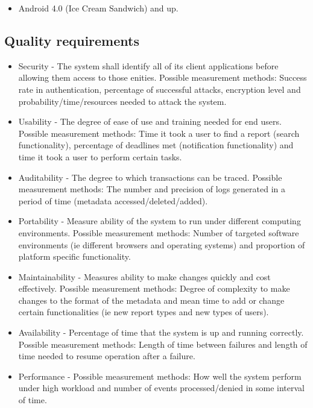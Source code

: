 \documentclass[11pt]{article}
\begin{document}
\begin{itemize}
	\item Android 4.0 (Ice Cream Sandwich) and up.
\end{itemize}

\subsection{Quality requirements}

\begin{itemize}
	\item Security - The system shall identify all of its client applications before allowing them access to those enities. Possible measurement methods: Success rate in authentication, percentage of successful attacks, encryption level and probability/time/resources needed to attack the system.
	\item Usability - The degree of ease of use and training needed for end users. Possible measurement methods: Time it took a user to find a report (search functionality), percentage of deadlines met (notification functionality) and time it took a user to perform certain tasks.
	\item Auditability - The degree to which transactions can be traced. Possible measurement methods: The number and precision of logs generated in a period of time (metadata accessed/deleted/added).
	\item Portability - Measure ability of the system to run under different computing environments. Possible measurement methods: Number of targeted software environments (ie different browsers and operating systems) and proportion of platform specific functionality.
	\item Maintainability - Measures ability to make changes quickly and cost effectively. Possible measurement methods: Degree of complexity to make changes to the format of the metadata and mean time to add or change certain functionalities (ie new report types and new types of users).
	\item Availability - Percentage of time that the system is up and running correctly. Possible measurement methods: Length of time between failures and length of time needed to resume operation after a failure.
	\item Performance - Possible measurement methods: How well the system perform under high workload and number of events processed/denied in some interval of time.
\end{itemize}
\end{document}
